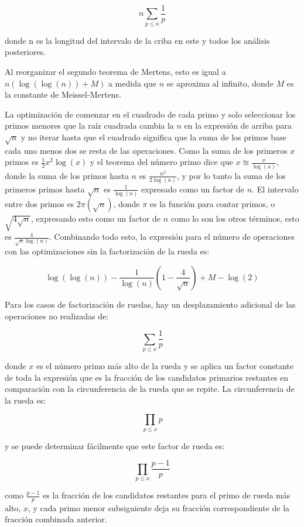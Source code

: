 \documentclass[12pt]{article}
\newcommand{\nl}{\vspace{0.3cm}}
\begin{document}
$$n \sum_{p \leqslant n}\frac{1}{p}$$

donde n es la longitud del intervalo de la criba en este y todos los análisis posteriores.

\nl

Al reorganizar el segundo teorema de Mertens, esto es igual a $n (\log(\log(n)) + M)$ a medida que $n$ se aproxima al infinito, donde $M$ es la constante de Meissel-Mertens.

\nl

La optimización de comenzar en el cuadrado de cada primo y solo seleccionar los primos menores que la raíz cuadrada cambia la $n$ en la expresión de arriba para $\sqrt{n}$ y no iterar hasta que el cuadrado significa que la suma de los primos base cada uno menos dos se resta de las operaciones. Como la suma de los primeros $x$ primos es $\frac{1}{2}x^2\log(x)$\cite{ant} y el teorema del número primo dice que $x \approxeq \frac{x}{\log(x)}$, donde la suma de los primos hasta $n$ es $\frac{n^2}{2 \log(n)}$, y por lo tanto la suma de los primeros primos hasta $\sqrt{n}$ es $\frac{1}{\log(n)}$ expresado como un factor de $n$. El intervalo entre dos primos es $2\pi(\sqrt{n})$, donde $\pi$ es la función para contar primos, o $\sqrt{4\sqrt{n}}$, expresando esto como un factor de $n$ como lo son los otros términos, esto es $\frac{4}{\sqrt{n}\log(n)}$. Combinando todo esto, la expresión para el número de operaciones con las optimizaciones sin la factorización de la rueda es:

$$\log(\log(n)) - \frac{1}{\log(n)} \left(1  -\frac{4}{\sqrt{n}}\right) + M - \log(2)$$

Para los casos de factorización de ruedas, hay un desplazamiento adicional de las operaciones no realizadas de:

$$ \sum_{p \leqslant x}\frac{1}{p} $$

donde $x$ es el número primo más alto de la rueda y se aplica un factor constante de toda la expresión que es la fracción de los candidatos primarios restantes en comparación con la circunferencia de la rueda que se repite. La circunferencia de la rueda es:

$$ \prod_{p \leqslant x}p $$

y se puede determinar fácilmente que este factor de rueda es:

$$ \prod_{p \leqslant x}\frac{p - 1}{p} $$

como $\frac{p - 1}{p}$ es la fracción de los candidatos restantes para el primo de rueda más alto, $x$, y cada primo menor subsiguiente deja su fracción correspondiente de la fracción combinada anterior.
\end{document}
